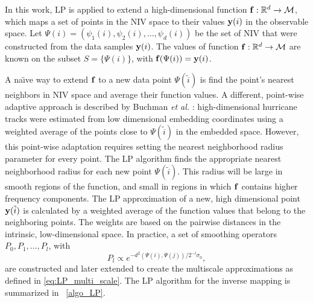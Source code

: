 In this work, LP is applied to extend a high-dimensional function $\mathbf{f}:\mathbb{R}^d \rightarrow \mathcal{M}$,
which maps a set of points in the NIV space to their values $\mathbf{y}(i)$ in the observable space.
%
Let $\Psi(i) = \left(\psi_1(i),\psi_2(i),\ldots,\psi_d(i)\right)$ be the set of NIV that were constructed from the data samples $\mathbf{y}(i)$.
%
The values of function $\mathbf{f}:\mathbb{R}^d \rightarrow \mathcal{M}$ are known on the subset $S = \{\Psi(i)\}$, with $\mathbf{f}(\Psi(i)) = \mathbf{y}(i)$.

A na\"{\i}ve way to extend $\mathbf{f}$ to a new data point $\Psi(\tilde{i})$ is find the point's nearest neighbors in NIV space and average their function values.
%
A different, point-wise adaptive approach is described by Buchman {\em et al.} \cite{buchman2011high}:
high-dimensional hurricane tracks were estimated from low dimensional embedding coordinates using a weighted average of the points close to $\Psi(\tilde{i})$ in the embedded space.
%
However, this point-wise adaptation requires setting the nearest neighborhood radius parameter for every point.
%
The LP algorithm finds the appropriate nearest neighborhood radius for each new point $\Psi(\tilde{i})$.
%
This radius will be large in smooth regions of the function, and small in regions in which $\mathbf{f}$ contains higher frequency components.
%
The LP approximation of a new, high dimensional point $\mathbf{y}(\tilde{i})$ is calculated by a weighted average of the function values that belong to the neighboring points.
%
The weights are based on the pairwise distances in the intrinsic, low-dimensional space.
%
In practice, a set of smoothing operators $P_0, P_1, \ldots, P_l$, with
\begin{equation} \label{eq:LP_multi_scale_app}
P_l \propto e^{-d^2(\Psi(i),\Psi(j)) / 2^{-l} \sigma_0},
\end{equation}
are constructed and later extended to create the multiscale approximations as defined in \eqref{eq:LP_multi_scale}.
%
The LP algorithm for the inverse mapping is summarized in \tab~\ref{algo_LP}.


